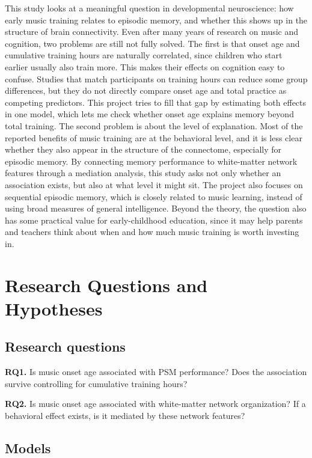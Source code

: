 \documentclass[11pt]{article}
\begin{document}
This study looks at a meaningful question in developmental neuroscience: how early music training relates to episodic memory, and whether this shows up in the structure of brain connectivity. Even after many years of research on music and cognition, two problems are still not fully solved. The first is that onset age and cumulative training hours are naturally correlated, since children who start earlier usually also train more. This makes their effects on cognition easy to confuse. Studies that match participants on training hours can reduce some group differences, but they do not directly compare onset age and total practice as competing predictors. This project tries to fill that gap by estimating both effects in one model, which lets me check whether onset age explains memory beyond total training. The second problem is about the level of explanation. Most of the reported benefits of music training are at the behavioral level, and it is less clear whether they also appear in the structure of the connectome, especially for episodic memory. By connecting memory performance to white-matter network features through a mediation analysis, this study asks not only whether an association exists, but also at what level it might sit. The project also focuses on sequential episodic memory, which is closely related to music learning, instead of using broad measures of general intelligence. Beyond the theory, the question also has some practical value for early-childhood education, since it may help parents and teachers think about when and how much music training is worth investing in.

\section{Research Questions and Hypotheses}

\subsection{Research questions}
\textbf{RQ1.} Is music onset age associated with PSM performance? Does the association survive controlling for cumulative training hours?

\textbf{RQ2.} Is music onset age associated with white-matter network organization? If a behavioral effect exists, is it mediated by these network features?

\subsection{Models}
\end{document}
